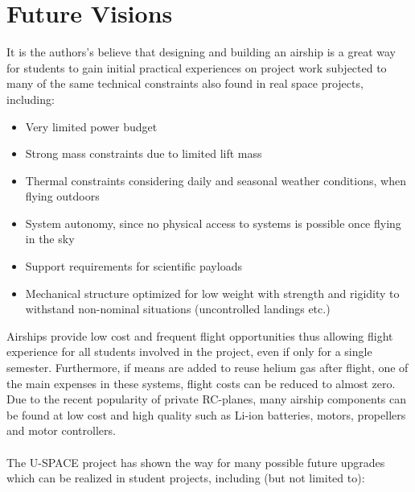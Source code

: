 \newpage
\chapter{Future Visions}
\label{chap:visions}
%
It is the authors's believe that designing and building an airship is a great way for students to gain initial practical experiences on project work subjected to many of the same technical constraints also found in real space projects, including:
%
\begin{itemize}
\item Very limited power budget
\item Strong mass constraints due to limited lift mass
\item Thermal constraints considering daily and seasonal weather conditions, when flying outdoors
\item System autonomy, since no physical access to systems is possible once flying in the sky
\item Support requirements for scientific payloads
\item Mechanical structure optimized for low weight with strength and rigidity to withstand non-nominal situations (uncontrolled landings etc.)
\end{itemize}
%
Airships provide low cost and frequent flight opportunities thus allowing flight experience for all students involved in the project, even if only for a single semester.  Furthermore, if means are added to reuse helium gas after flight, one of the main expenses in these systems, flight costs can be reduced to almost zero.
Due to the recent popularity of private \ac{RC}-planes, many airship components can be found at low cost and high quality such as Li-ion batteries, motors, propellers and motor controllers.
\\\\
%
\noindent
The U-SPACE project has shown the way for many possible future upgrades which can be realized in student projects, including (but not limited to): 
%
